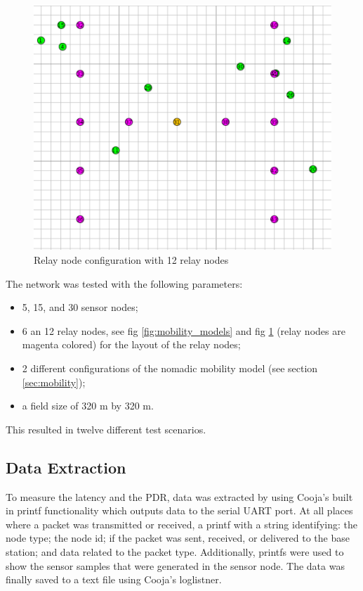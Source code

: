 \documentclass[conference]{IEEEtran}
\begin{document}
\begin{figure}
    \centering
    \includegraphics[scale=0.3, keepaspectratio]{Relay_Nodes.pdf}
    \caption{Relay node configuration with 12 relay nodes}
    \label{fig:relay_nodes}
\end{figure}

The network was tested with the following parameters:

\begin{itemize}
    \item 5, 15, and 30 sensor nodes;
    \item 6 an 12 relay nodes, see fig \ref{fig:mobility_models} and fig
        \ref{fig:relay_nodes} (relay nodes are magenta colored)
        for the layout of the relay nodes;
    \item 2 different configurations of the nomadic mobility model
        (see section \ref{sec:mobility});
    \item a field size of 320 m by 320 m.
\end{itemize}

This resulted in twelve different test scenarios.

\subsection{Data Extraction} 

To measure the latency and the PDR, data was extracted by using Cooja's built
in printf functionality which outputs data to the serial UART port. At all
places where a packet was transmitted or received, a printf with a string
identifying: the node type; the node id; if the packet was sent, received, or
delivered to the base station; and data related to the packet type.
Additionally, printfs were used to show the sensor samples that were generated
in the sensor node. The data was finally saved to a text file using Cooja's
loglistner.
\end{document}
